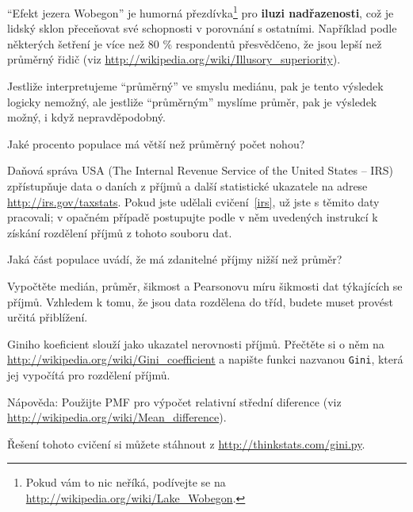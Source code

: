 \documentclass[12pt]{book}
\begin{document}
\begin{exercise}
``Efekt jezera Wobegon'' je humorná přezdívka\footnote{Pokud vám to nic neříká, podívejte se na
 \url{http://wikipedia.org/wiki/Lake_Wobegon}.} pro {\bf
  iluzi nadřazenosti}, což je lidský sklon přeceňovat své schopnosti v porovnání s ostatními. Například podle některých šetření je více než 80 \% respondentů přesvědčeno, že jsou lepší než průměrný řidič (viz
  \url{http://wikipedia.org/wiki/Illusory_superiority}).

Jestliže interpretujeme ``průměrný'' ve smyslu mediánu, pak je tento výsledek logicky nemožný, ale jestliže ``průměrným'' myslíme průměr, pak je výsledek možný, i když nepravděpodobný.

Jaké procento populace má větší než průměrný počet nohou?

\end{exercise}


\begin{exercise}
Daňová správa USA (The Internal Revenue Service of the United States -- IRS) zpřístupňuje data o daních z příjmů a další statistické ukazatele na adrese \url{http://irs.gov/taxstats}.
Pokud jste udělali cvičení~\ref{irs}, už jste s těmito daty pracovali;
v opačném případě postupujte podle v něm uvedených instrukcí k získání rozdělení příjmů z tohoto souboru dat.

Jaká část populace uvádí, že má zdanitelné příjmy nižší než průměr?

Vypočtěte medián, průměr, šikmost a Pearsonovu míru šikmosti dat týkajících se příjmů.  Vzhledem k tomu, že jsou data rozdělena do tříd, budete muset provést určitá přiblížení.

Giniho koeficient slouží jako ukazatel nerovnosti příjmů.  Přečtěte si o něm na \url{http://wikipedia.org/wiki/Gini_coefficient} a napište funkci nazvanou {\tt Gini}, která jej vypočítá pro rozdělení příjmů.

Nápověda: Použijte PMF pro výpočet relativní střední diference (viz \url{http://wikipedia.org/wiki/Mean_difference}).

Řešení tohoto cvičení si můžete stáhnout z \url{http://thinkstats.com/gini.py}.

\end{exercise}
\end{document}
